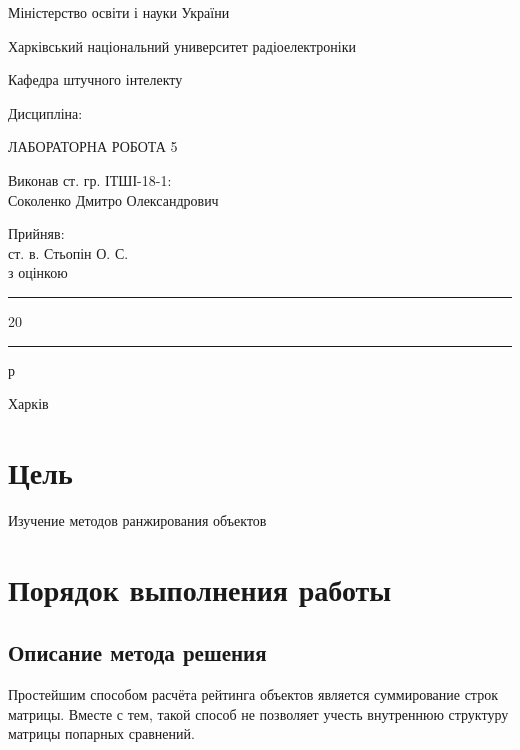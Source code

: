 \documentclass[a4paper,14pt]{extarticle}
\begin{document}
\begin{titlepage}
	\centering
    Міністерство освіти і науки України
    
    Харківський національний университет радіоелектроніки

    \vspace{1cm}
    Кафедра штучного інтелекту

    \vspace{2cm}
    Дисципліна: 

    \vspace{2cm}
    \uppercase{Лабораторна робота 5}

    
    \uppercase{}

    \vspace{4cm}
    \begin{minipage}[t]{10cm}
        Виконав ст. гр. ІТШІ-18-1:\\
        Соколенко Дмитро Олександрович
    \end{minipage}
    \hfill
    \begin{minipage}[t]{6cm}
        Прийняв:\\
        ст. в. Стьопін О. С.\\
        з оцінкою \say{\rule{2cm}{0.15mm}}\\
        \say{\rule{0.7cm}{0.15mm}}\rule{2cm}{0.15mm}20\rule{0.7cm}{0.15mm}р
    \end{minipage}

	\vfill

	{Харків \the\year{}}
\end{titlepage}
\section*{Цель}
Изучение методов ранжирования объектов

\section{Порядок выполнения работы}

\subsection{Описание метода решения}
Простейшим способом расчёта рейтинга объектов является суммирование
строк матрицы. Вместе с тем, такой способ не позволяет учесть внутреннюю
структуру матрицы попарных сравнений.
\end{document}
